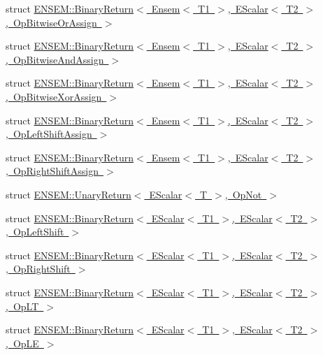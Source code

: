 \begin{DoxyCompactItemize}
\item 
struct \mbox{\hyperlink{structENSEM_1_1BinaryReturn_3_01Ensem_3_01T1_01_4_00_01EScalar_3_01T2_01_4_00_01OpBitwiseOrAssign_01_4}{E\+N\+S\+E\+M\+::\+Binary\+Return$<$ Ensem$<$ T1 $>$, E\+Scalar$<$ T2 $>$, Op\+Bitwise\+Or\+Assign $>$}}
\item 
struct \mbox{\hyperlink{structENSEM_1_1BinaryReturn_3_01Ensem_3_01T1_01_4_00_01EScalar_3_01T2_01_4_00_01OpBitwiseAndAssign_01_4}{E\+N\+S\+E\+M\+::\+Binary\+Return$<$ Ensem$<$ T1 $>$, E\+Scalar$<$ T2 $>$, Op\+Bitwise\+And\+Assign $>$}}
\item 
struct \mbox{\hyperlink{structENSEM_1_1BinaryReturn_3_01Ensem_3_01T1_01_4_00_01EScalar_3_01T2_01_4_00_01OpBitwiseXorAssign_01_4}{E\+N\+S\+E\+M\+::\+Binary\+Return$<$ Ensem$<$ T1 $>$, E\+Scalar$<$ T2 $>$, Op\+Bitwise\+Xor\+Assign $>$}}
\item 
struct \mbox{\hyperlink{structENSEM_1_1BinaryReturn_3_01Ensem_3_01T1_01_4_00_01EScalar_3_01T2_01_4_00_01OpLeftShiftAssign_01_4}{E\+N\+S\+E\+M\+::\+Binary\+Return$<$ Ensem$<$ T1 $>$, E\+Scalar$<$ T2 $>$, Op\+Left\+Shift\+Assign $>$}}
\item 
struct \mbox{\hyperlink{structENSEM_1_1BinaryReturn_3_01Ensem_3_01T1_01_4_00_01EScalar_3_01T2_01_4_00_01OpRightShiftAssign_01_4}{E\+N\+S\+E\+M\+::\+Binary\+Return$<$ Ensem$<$ T1 $>$, E\+Scalar$<$ T2 $>$, Op\+Right\+Shift\+Assign $>$}}
\item 
struct \mbox{\hyperlink{structENSEM_1_1UnaryReturn_3_01EScalar_3_01T_01_4_00_01OpNot_01_4}{E\+N\+S\+E\+M\+::\+Unary\+Return$<$ E\+Scalar$<$ T $>$, Op\+Not $>$}}
\item 
struct \mbox{\hyperlink{structENSEM_1_1BinaryReturn_3_01EScalar_3_01T1_01_4_00_01EScalar_3_01T2_01_4_00_01OpLeftShift_01_4}{E\+N\+S\+E\+M\+::\+Binary\+Return$<$ E\+Scalar$<$ T1 $>$, E\+Scalar$<$ T2 $>$, Op\+Left\+Shift $>$}}
\item 
struct \mbox{\hyperlink{structENSEM_1_1BinaryReturn_3_01EScalar_3_01T1_01_4_00_01EScalar_3_01T2_01_4_00_01OpRightShift_01_4}{E\+N\+S\+E\+M\+::\+Binary\+Return$<$ E\+Scalar$<$ T1 $>$, E\+Scalar$<$ T2 $>$, Op\+Right\+Shift $>$}}
\item 
struct \mbox{\hyperlink{structENSEM_1_1BinaryReturn_3_01EScalar_3_01T1_01_4_00_01EScalar_3_01T2_01_4_00_01OpLT_01_4}{E\+N\+S\+E\+M\+::\+Binary\+Return$<$ E\+Scalar$<$ T1 $>$, E\+Scalar$<$ T2 $>$, Op\+L\+T $>$}}
\item 
struct \mbox{\hyperlink{structENSEM_1_1BinaryReturn_3_01EScalar_3_01T1_01_4_00_01EScalar_3_01T2_01_4_00_01OpLE_01_4}{E\+N\+S\+E\+M\+::\+Binary\+Return$<$ E\+Scalar$<$ T1 $>$, E\+Scalar$<$ T2 $>$, Op\+L\+E $>$}}

\end{DoxyCompactItemize}
